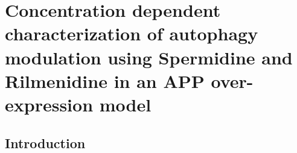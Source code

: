 \chapter{Concentration dependent characterization of autophagy modulation using Spermidine and Rilmenidine in an APP over-expression model }
\section{Introduction}